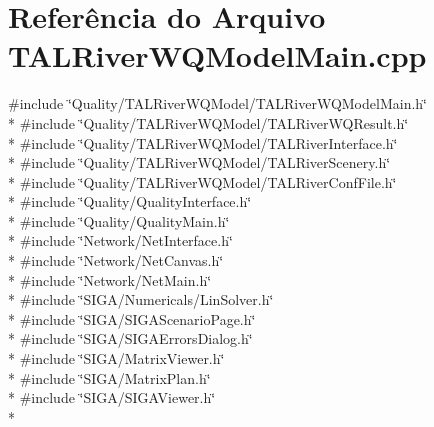 \section{Referência do Arquivo T\+A\+L\+River\+W\+Q\+Model\+Main.\+cpp}
\label{_t_a_l_river_w_q_model_main_8cpp}
{\ttfamily \#include \char`\"{}Quality/\+T\+A\+L\+River\+W\+Q\+Model/\+T\+A\+L\+River\+W\+Q\+Model\+Main.\+h\char`\"{}}\\*
{\ttfamily \#include \char`\"{}Quality/\+T\+A\+L\+River\+W\+Q\+Model/\+T\+A\+L\+River\+W\+Q\+Result.\+h\char`\"{}}\\*
{\ttfamily \#include \char`\"{}Quality/\+T\+A\+L\+River\+W\+Q\+Model/\+T\+A\+L\+River\+Interface.\+h\char`\"{}}\\*
{\ttfamily \#include \char`\"{}Quality/\+T\+A\+L\+River\+W\+Q\+Model/\+T\+A\+L\+River\+Scenery.\+h\char`\"{}}\\*
{\ttfamily \#include \char`\"{}Quality/\+T\+A\+L\+River\+W\+Q\+Model/\+T\+A\+L\+River\+Conf\+File.\+h\char`\"{}}\\*
{\ttfamily \#include \char`\"{}Quality/\+Quality\+Interface.\+h\char`\"{}}\\*
{\ttfamily \#include \char`\"{}Quality/\+Quality\+Main.\+h\char`\"{}}\\*
{\ttfamily \#include \char`\"{}Network/\+Net\+Interface.\+h\char`\"{}}\\*
{\ttfamily \#include \char`\"{}Network/\+Net\+Canvas.\+h\char`\"{}}\\*
{\ttfamily \#include \char`\"{}Network/\+Net\+Main.\+h\char`\"{}}\\*
{\ttfamily \#include \char`\"{}S\+I\+G\+A/\+Numericals/\+Lin\+Solver.\+h\char`\"{}}\\*
{\ttfamily \#include \char`\"{}S\+I\+G\+A/\+S\+I\+G\+A\+Scenario\+Page.\+h\char`\"{}}\\*
{\ttfamily \#include \char`\"{}S\+I\+G\+A/\+S\+I\+G\+A\+Errors\+Dialog.\+h\char`\"{}}\\*
{\ttfamily \#include \char`\"{}S\+I\+G\+A/\+Matrix\+Viewer.\+h\char`\"{}}\\*
{\ttfamily \#include \char`\"{}S\+I\+G\+A/\+Matrix\+Plan.\+h\char`\"{}}\\*
{\ttfamily \#include \char`\"{}S\+I\+G\+A/\+S\+I\+G\+A\+Viewer.\+h\char`\"{}}\\*

